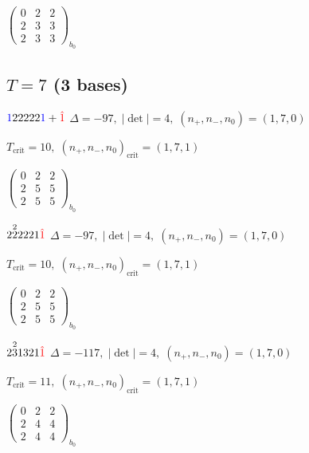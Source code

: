 \documentclass[10pt]{article}
\begin{document}
\hspace{2em}$\left(\begin{smallmatrix}0 & 2 & 2 \\ 2 & 3 & 3 \\ 2 & 3 & 3\end{smallmatrix}\right)_{\!b_0}$


\subsection*{$T = 7$ \quad (3 bases)}
\smallskip

$\textcolor{blue}{1}22222\textcolor{blue}{1}+\textcolor{red}{\hat{1}}$ \quad $\Delta=-97,\; |\det|=4,\; (n_+,n_-,n_0)=(1,7,0)$

\hspace{1em}$T_{\text{crit}}=10,\; (n_+,n_-,n_0)_{\text{crit}}=(1,7,1)$

\hspace{2em}$\left(\begin{smallmatrix}0 & 2 & 2 \\ 2 & 5 & 5 \\ 2 & 5 & 5\end{smallmatrix}\right)_{\!b_0}$

\smallskip

$2\overset{2}{2}2221\textcolor{red}{\hat{1}}$ \quad $\Delta=-97,\; |\det|=4,\; (n_+,n_-,n_0)=(1,7,0)$

\hspace{1em}$T_{\text{crit}}=10,\; (n_+,n_-,n_0)_{\text{crit}}=(1,7,1)$

\hspace{2em}$\left(\begin{smallmatrix}0 & 2 & 2 \\ 2 & 5 & 5 \\ 2 & 5 & 5\end{smallmatrix}\right)_{\!b_0}$

\smallskip

$2\overset{2}{3}1321\textcolor{red}{\hat{1}}$ \quad $\Delta=-117,\; |\det|=4,\; (n_+,n_-,n_0)=(1,7,0)$

\hspace{1em}$T_{\text{crit}}=11,\; (n_+,n_-,n_0)_{\text{crit}}=(1,7,1)$

\hspace{2em}$\left(\begin{smallmatrix}0 & 2 & 2 \\ 2 & 4 & 4 \\ 2 & 4 & 4\end{smallmatrix}\right)_{\!b_0}$
\end{document}
